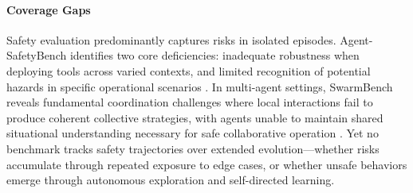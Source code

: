 \paragraph{Coverage Gaps}
Safety evaluation predominantly captures risks in isolated episodes. Agent-SafetyBench identifies two core deficiencies: inadequate robustness when deploying tools across varied contexts, and limited recognition of potential hazards in specific operational scenarios \citep{zhang2024agentsafety}. In multi-agent settings, SwarmBench reveals fundamental coordination challenges where local interactions fail to produce coherent collective strategies, with agents unable to maintain shared situational understanding necessary for safe collaborative operation \citep{ruan2025benchmarking}. Yet no benchmark tracks safety trajectories over extended evolution—whether risks accumulate through repeated exposure to edge cases, or whether unsafe behaviors emerge through autonomous exploration and self-directed learning.



